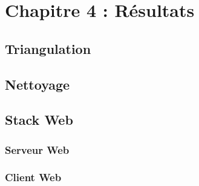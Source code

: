 \chapter{Chapitre 4 : Résultats}
\section{Triangulation}
\section{Nettoyage}
\section{Stack Web}
\subsection{Serveur Web}
\subsection{Client Web}

